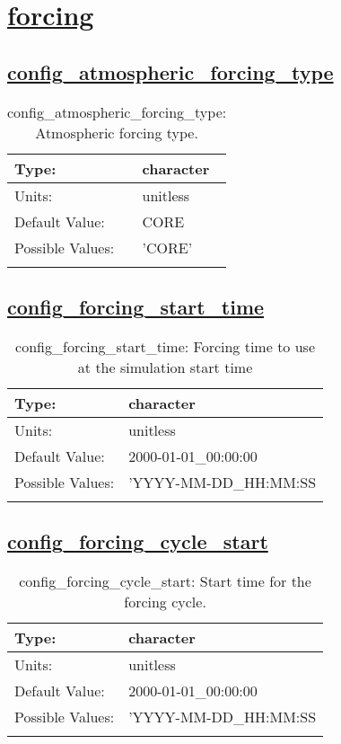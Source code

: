 \section[forcing]{\hyperref[sec:nm_tab_forcing]{forcing}}
\label{sec:nm_sec_forcing}
\subsection[config\_atmospheric\_forcing\_type]{\hyperref[sec:nm_tab_forcing]{config\_atmospheric\_forcing\_type}}
\label{subsec:nm_sec_config_atmospheric_forcing_type}
\begin{center}
\begin{longtable}{| p{2.0in} || p{4.0in} |}
    \hline
    Type: & character \\
    \hline
    Units: & \si{unitless} \\
    \hline
    Default Value: & CORE \\
    \hline
    Possible Values: & 'CORE' \\
    \hline
    \caption{config\_atmospheric\_forcing\_type: Atmospheric forcing type.}
\end{longtable}
\end{center}
\subsection[config\_forcing\_start\_time]{\hyperref[sec:nm_tab_forcing]{config\_forcing\_start\_time}}
\label{subsec:nm_sec_config_forcing_start_time}
\begin{center}
\begin{longtable}{| p{2.0in} || p{4.0in} |}
    \hline
    Type: & character \\
    \hline
    Units: & \si{unitless} \\
    \hline
    Default Value: & 2000-01-01\_00:00:00 \\
    \hline
    Possible Values: & 'YYYY-MM-DD\_HH:MM:SS \\
    \hline
    \caption{config\_forcing\_start\_time: Forcing time to use at the simulation start time}
\end{longtable}
\end{center}
\subsection[config\_forcing\_cycle\_start]{\hyperref[sec:nm_tab_forcing]{config\_forcing\_cycle\_start}}
\label{subsec:nm_sec_config_forcing_cycle_start}
\begin{center}
\begin{longtable}{| p{2.0in} || p{4.0in} |}
    \hline
    Type: & character \\
    \hline
    Units: & \si{unitless} \\
    \hline
    Default Value: & 2000-01-01\_00:00:00 \\
    \hline
    Possible Values: & 'YYYY-MM-DD\_HH:MM:SS \\
    \hline
    \caption{config\_forcing\_cycle\_start: Start time for the forcing cycle.}
\end{longtable}
\end{center}
